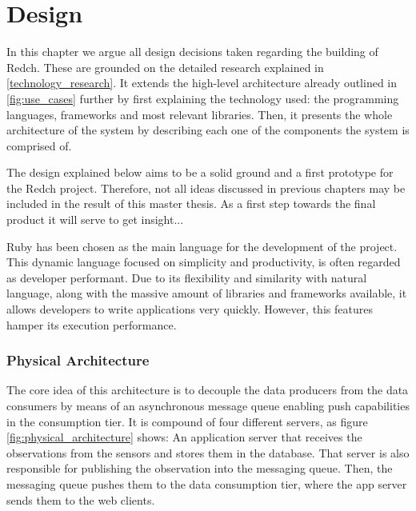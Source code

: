 \chapter{Design}

In this chapter we argue all design decisions taken regarding the building of Redch. These are grounded on the detailed research explained in \ref{technology_research}. It extends the high-level architecture already outlined in \ref{fig:use_cases} further by first explaining the technology used: the programming languages, frameworks and most relevant libraries. Then, it presents the whole architecture of the system by describing each one of the components the system is comprised of.

The design explained below aims to be a solid ground and a first prototype for the Redch project. Therefore, not all ideas discussed in previous chapters may be included in the result of this master thesis. As a first step towards the final product it will serve to get insight...

Ruby has been chosen as the main language for the development of the project. This dynamic language focused on simplicity and productivity, is often regarded as developer performant. Due to its flexibility and similarity with natural language, along with the massive amount of libraries and frameworks available, it allows developers to write applications very quickly. However, this features hamper its execution performance.

\subsection{Physical Architecture}

The core idea of this architecture is to decouple the data producers from the data consumers by means of an asynchronous message queue enabling push capabilities in the consumption tier. It is compound of four different servers, as figure \ref{fig:physical_architecture} shows: An application server that receives the observations from the sensors and stores them in the database. That server is also responsible for publishing the observation into the messaging queue. Then, the messaging queue pushes them to the data consumption tier, where the app server sends them to the web clients.

